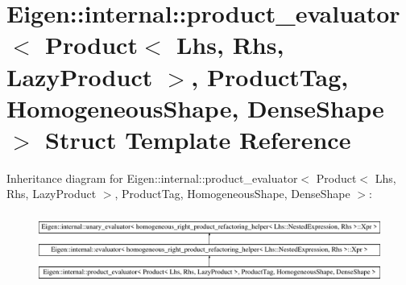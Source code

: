 \hypertarget{struct_eigen_1_1internal_1_1product__evaluator_3_01_product_3_01_lhs_00_01_rhs_00_01_lazy_produc94c394146b0a8c54b74b1b296d175015}{}\section{Eigen\+::internal\+::product\+\_\+evaluator$<$ Product$<$ Lhs, Rhs, Lazy\+Product $>$, Product\+Tag, Homogeneous\+Shape, Dense\+Shape $>$ Struct Template Reference}
\label{struct_eigen_1_1internal_1_1product__evaluator_3_01_product_3_01_lhs_00_01_rhs_00_01_lazy_produc94c394146b0a8c54b74b1b296d175015}
Inheritance diagram for Eigen\+::internal\+::product\+\_\+evaluator$<$ Product$<$ Lhs, Rhs, Lazy\+Product $>$, Product\+Tag, Homogeneous\+Shape, Dense\+Shape $>$\+:\begin{figure}[H]
\begin{center}
\leavevmode
\includegraphics[height=2.362869cm]{struct_eigen_1_1internal_1_1product__evaluator_3_01_product_3_01_lhs_00_01_rhs_00_01_lazy_produc94c394146b0a8c54b74b1b296d175015}
\end{center}
\end{figure}

